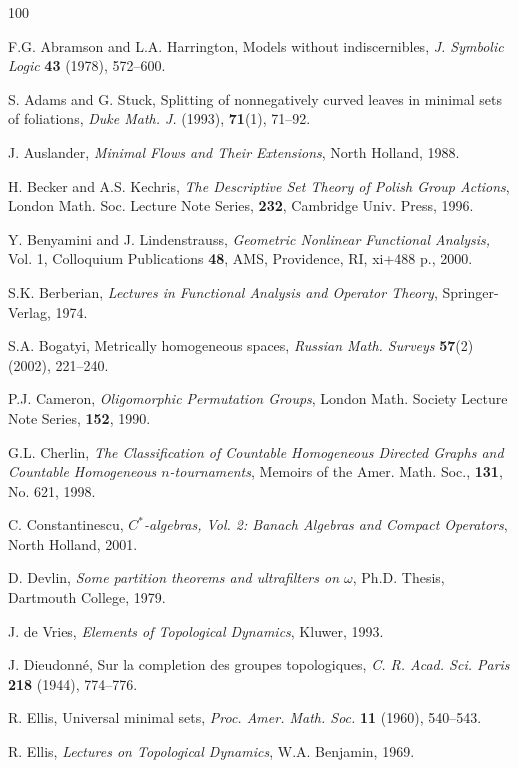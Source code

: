 \begin{thebibliography}{100}

F.G. Abramson and L.A. Harrington, Models without indiscernibles,
{\it J. Symbolic Logic} {\bf 43} (1978), 572--600.

S. Adams and G. Stuck, Splitting of nonnegatively curved leaves in
minimal sets of foliations, {\it Duke Math. J.} (1993), {\bf 71}(1),
71--92.

J. Auslander, {\it Minimal Flows and Their Extensions}, North Holland,
1988.

H. Becker and A.S. Kechris, {\it The Descriptive Set Theory of
Polish Group Actions}, London Math. Soc. Lecture Note Series, {\bf 232},
Cambridge Univ. Press, 1996.

 Y. Benyamini and J. Lindenstrauss,
{\it Geometric Nonlinear Functional Analysis,} Vol. 1,
Colloquium Publications {\bf 48}, AMS,
Providence, RI, xi+488 p., 2000.

S.K. Berberian, {\it Lectures in Functional Analysis and Operator
Theory}, Springer-Verlag, 1974.

S.A. Bogatyi, Metrically homogeneous spaces, {\it Russian Math. Surveys}
{\bf 57}(2) (2002), 221--240.

P.J. Cameron, {\it Oligomorphic Permutation Groups}, London Math.
Society Lecture Note Series, {\bf 152}, 1990.

G.L. Cherlin, {\it The Classification of Countable Homogeneous
Directed Graphs and Countable Homogeneous \(n\)-tournaments}, Memoirs
of the Amer. Math. Soc., {\bf 131}, No. 621, 1998.

C. Constantinescu, {\it \(C^*\)-algebras, Vol. 2:  Banach Algebras
and Compact Operators}, North Holland, 2001.

D. Devlin, {\it Some partition theorems and ultrafilters on \(\omega\)},
Ph.D. Thesis, Dartmouth College, 1979.

J. de Vries, {\it Elements of Topological Dynamics}, Kluwer, 1993.

 J. Dieudonn\'e, Sur la completion des groupes topologiques,
{\it C. R. Acad. Sci. Paris} {\bf 218} (1944), 774--776.

R. Ellis, Universal minimal sets, {\it Proc. Amer. Math. Soc.} {\bf
11} (1960), 540--543.

R. Ellis, {\it Lectures on Topological Dynamics}, W.A. Benjamin, 1969.


\end{thebibliography}
